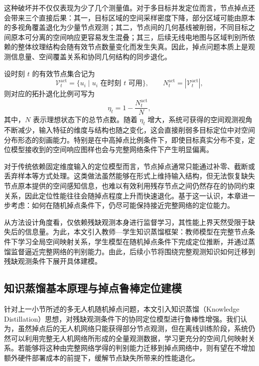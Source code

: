 这种破坏并不仅仅表现为少了几个测量值。对于多目标并发定位而言，节点掉点还会带来三个直接后果：其一，目标区域的空间采样密度下降，部分区域可能由原本的多视角覆盖退化为少量节点观测；其二，节点间的几何基线被削弱，不同目标之间原本可分离的空间响应更容易发生混叠；其三，后续无线电地图与区域判别所依赖的整体纹理结构会随有效节点数量变化而发生失真。因此，掉点问题本质上是观测信息量、空间覆盖关系和协同几何结构的同步退化。

设时刻 \(t\) 的有效节点集合记为
\begin{equation}
\mathcal{V}_{t}^{\mathrm{act}}
=
\{u_i \mid u_i \text{ 在时刻 } t \text{ 可用}\},
\qquad
N_t^{\mathrm{act}} = |\mathcal{V}_{t}^{\mathrm{act}}|,
\label{eq:4_40_active_node_set}
\end{equation}
则对应的拓扑退化比例可写为
\begin{equation}
\eta_t
=
1-\frac{N_t^{\mathrm{act}}}{N},
\label{eq:4_41_dropout_ratio}
\end{equation}
其中，\(N\) 表示理想状态下的总节点数。随着 \(\eta_t\) 增大，系统可获得的空间观测视角不断减少，输入特征的维度与结构也随之变化，这会直接削弱多目标定位中对空间分布形态的刻画能力。特别是在中高掉点比例条件下，即使目标真实分布不变，定位模型接收到的空间响应图样也会与完整网络条件下产生明显偏离。

对于传统依赖固定维度输入的定位模型而言，节点掉点通常只能通过补零、截断或丢弃样本等方式处理。这类做法虽然能够在形式上维持输入结构，但无法恢复缺失节点原本提供的空间感知信息，也难以有效利用残存节点之间仍然存在的协同约束关系，因此定位性能往往会随掉点程度上升而快速退化。基于这一认识，本章进一步考虑：如何在随机掉点条件下，仍尽可能保持接近完整网络的定位能力。

从方法设计角度看，仅依赖残缺观测本身进行监督学习，其性能上界天然受限于缺失后的信息量。为此，本文引入教师—学生知识蒸馏框架：教师模型在完整节点条件下学习全局空间映射关系，学生模型在随机掉点条件下完成定位推断，并通过蒸馏监督逼近完整网络的判别能力。由此，后续小节将围绕完整观测知识如何迁移到残缺观测条件下展开具体建模。

\subsection{知识蒸馏基本原理与掉点鲁棒定位建模}
\label{subsec:4_3_2}

针对上一小节所述的多无人机随机掉点问题，本文引入知识蒸馏（Knowledge Distillation）思想，对残缺观测条件下的协同定位模型进行鲁棒性增强。我们认为，虽然掉点后的无人机网络只能获得部分节点观测，但在离线训练阶段，系统仍然可以利用完整无人机网络所形成的全量观测数据，学习更充分的空间几何映射关系。若能够将这种由完整网络学得的判别能力迁移到掉点网络中，则有望在不增加额外硬件部署成本的前提下，缓解节点缺失所带来的性能退化。

